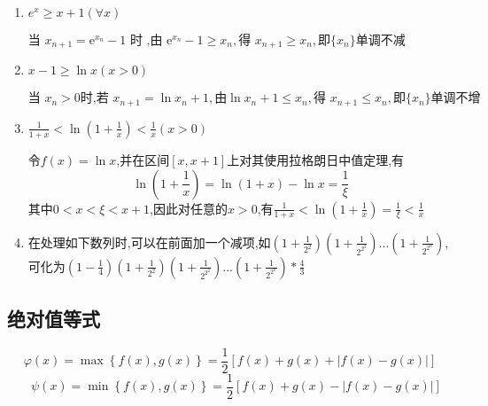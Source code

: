 \documentclass[12pt, a4paper, oneside, UTF8]{ctexbook}  %
\begin{document}
\begin{sloppypar}
\begin{enumerate}
        \item $e^x \geqslant  x+1 (\forall x)$
              \begin{criterion}{}{}
                  $\text{当 }x_{n+1}=\mathrm{e}^{x_n}-1\text{ 时 ,由 }\mathrm{e}^{x_n}-1\geqslant x_n,\text{得 }x_{n+1}\geqslant x_n,\text{即} \{x_n\} \text{单调不减}$
              \end{criterion}
        \item $x-1 \geqslant \ln x(x>0)$
              \begin{criterion}{}{}
                  $\text{当 }x_{n}>0\text{时,若 }x_{n+1}=\ln x_{n}+1,\text{由}\ln x_{n}+1\leqslant x_{n},\text{得 }x_{n+1}\leqslant x_{n},\text{即}\{ x_{n}\} \text{单调不增}$
              \end{criterion}
        \item $\frac{1}{1+x}<\ln(1+\frac{1}{x})<\frac{1}{x}(x>0)$
              \begin{criterion}{}{}
                  令$f(x)=\ln x$,并在区间$[x,x+1]$上对其使用拉格朗日中值定理,有
                  $$
                      \ln\left(1+\frac{1}{x}\right)=\ln(1+x)-\ln x=\frac{1}{\xi}
                  $$
                  其中$0<x<\xi<x+1$,因此对任意的$x>0$,有$\frac{1}{1+x}<\ln\left(1+\frac{1}{x}\right)=\frac{1}{\xi}<\frac{1}{x}$
              \end{criterion}
        \item 在处理如下数列时,可以在前面加一个减项,如$(1+\frac{1}{2^2})(1+\frac{1}{2^{2^2}})...(1+\frac{1}{2^{2^n}})$,可化为$(1-\frac{1}{4})(1+\frac{1}{2^2})(1+\frac{1}{2^{2^2}})...(1+\frac{1}{2^{2^n}})*\frac{4}{3}$
    \end{enumerate}
    \subsection{绝对值等式}
    $$\varphi(x)=\operatorname*{max}\left\{f(x),g(x)\right\}=\frac{1}{2}[f(x)+g(x)+|f(x)-g(x)|]$$
    $$\quad\psi(x)=\operatorname*{min}\left\{f(x),g(x) \right\}=\frac{1}{2}[f(x)+g(x)-|f(x)-g(x)|]$$

    \ifx\allfiles\undefined
\end{sloppypar}
\end{document}
